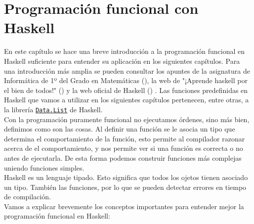 \chapter{Programación funcional con Haskell}\label{sec:progfunHas}

En este capítulo se hace una breve introducción a la programación funcional en
Haskell suficiente para entender su aplicación en los siguientes
capítulos. Para una introducción más amplia se pueden consultar los apuntes de
la asignatura de Informática de 1º del Grado en Matemáticas
(\cite{Alonso-15b}), la web de "¡Aprende haskell por el bien de todos!" (\cite{aprendehaskell}) y la web oficial de Haskell (\cite{haskell}) . Las funciones predefinidas en Haskell que vamos a utilizar en los siguientes capítulos pertenecen, entre otras, a la librería \href{http://hackage.haskell.org/package/base-4.11.1.0/docs/Data-List.html}{\texttt{Data.List}} de Haskell.\\

Con la programación puramente funcional no ejecutamos órdenes, sino más bien, definimos como son las cosas. Al definir una función se le asocia un tipo que determina el comportamiento de la función, esto permite al compilador razonar acerca de el comportamiento, y nos permite ver si una función es correcta o no antes de ejecutarla. De esta forma podemos construir funciones más complejas uniendo funciones simples.\\

Haskell es un lenguaje tipado. Esto significa que todos los ojetos tienen asociado un tipo. También las funciones, por lo que se pueden detectar errores en tiempo de compilación.\\

Vamos a explicar brevemente los conceptos importantes para entender mejor la programación funcional en Haskell:

